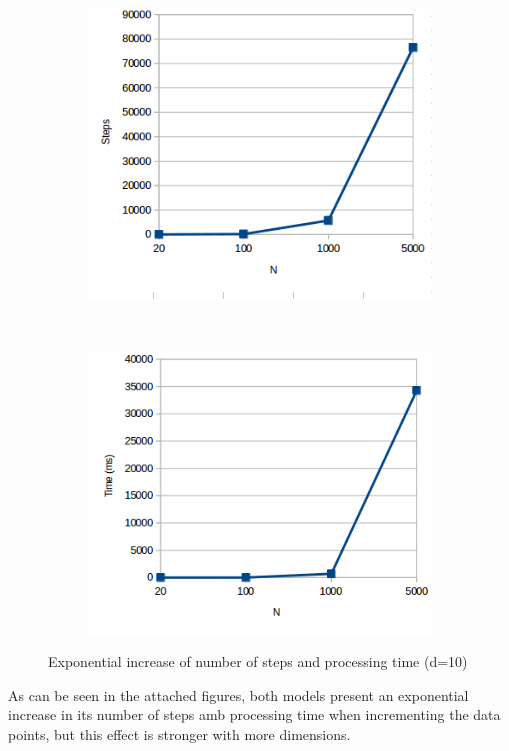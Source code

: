 \documentclass{article}
\begin{document}
\begin{enumerate}[label=(\alph*)]
\begin{figure}[H]
    \centering
    \begin{subfigure}[t]{0.5\textwidth}
        \centering
		\includegraphics[scale=0.5]{images/6_c.png} 
    \end{subfigure}%
    ~ 
    \begin{subfigure}[t]{0.5\textwidth}
        \centering
		\includegraphics[scale=0.5]{images/6_d.png} 
    \end{subfigure}
    \caption{Exponential increase of number of steps and processing time (d=10)}
\end{figure}

As can be seen in the attached figures, both models present an exponential increase in its number of steps amb processing time when incrementing the data points, but this effect is stronger with more dimensions.\\


\end{enumerate}
\end{document}

